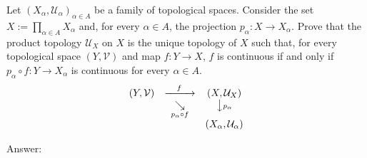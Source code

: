 \documentclass[12pt]{article}
\begin{document}
\noindent Let $(X_\alpha,\mathcal{U}_\alpha)_{\alpha\in A}$ be a family of topological spaces. Consider the set $X:=\prod_{\alpha\in A}X_\alpha$ and, for every $\alpha\in A$, the projection $p_\alpha:X\to X_\alpha$. Prove that the product topology $\mathcal{U}_X$ on $X$ is the unique topology of $X$ such that, for every topological space $(Y,\mathcal{V})$ and map $f:Y\to X$, $f$ is continuous if and only if $p_\alpha\circ f:Y\to X_\alpha$ is continuous for every $\alpha\in A$.
\begin{align*}
\begin{array}{ccc}
(Y,\mathcal{V}) & \xrightarrow{\quad f\quad} & (X,\mathcal{U}_X)\\
& \underset{p_\alpha\circ f}{\searrow} & \big\downarrow{\scriptstyle p_\alpha}\\
&& (X_\alpha,\mathcal{U}_\alpha)
\end{array}
\end{align*}

\vspace{1cm}
\noindent
Answer:\\
\\
\end{document}
